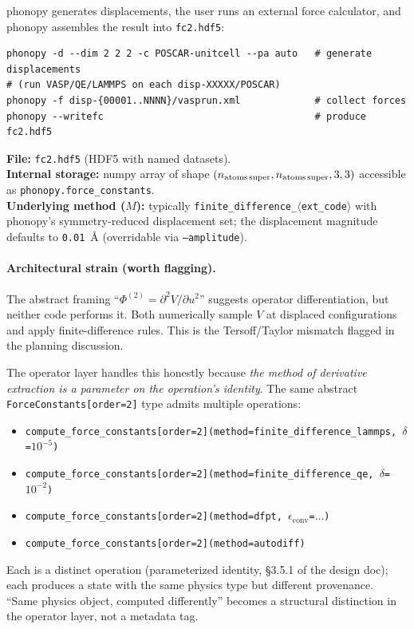 \documentclass[11pt,a4paper]{article}
\begin{document}
\begin{phonobox}
phonopy generates displacements, the user runs an external force calculator, and phonopy
assembles the result into \texttt{fc2.hdf5}:
\begin{verbatim}
phonopy -d --dim 2 2 2 -c POSCAR-unitcell --pa auto   # generate displacements
# (run VASP/QE/LAMMPS on each disp-XXXXX/POSCAR)
phonopy -f disp-{00001..NNNN}/vasprun.xml             # collect forces
phonopy --writefc                                     # produce fc2.hdf5
\end{verbatim}
\textbf{File:} \texttt{fc2.hdf5} (HDF5 with named datasets).\\
\textbf{Internal storage:} numpy array of shape
$(n_{\text{atoms\,super}}, n_{\text{atoms\,super}}, 3, 3)$ accessible as
\texttt{phonopy.force\_constants}.\\
\textbf{Underlying method ($M$):} typically \texttt{finite\_difference\_$\langle$ext\_code$\rangle$}
with phonopy's symmetry-reduced displacement set; the displacement magnitude defaults to
\texttt{0.01}~\AA{} (overridable via \texttt{--amplitude}).
\end{phonobox}

\paragraph{Architectural strain (worth flagging).} The abstract framing
``$\Phi^{(2)} = \partial^2 V / \partial u^2$'' suggests operator differentiation, but neither
code performs it. Both numerically sample $V$ at displaced configurations and apply
finite-difference rules. This is the Tersoff/Taylor mismatch flagged in the planning
discussion.

\medskip
The operator layer handles this honestly because \emph{the method of derivative extraction is a
parameter on the operation's identity}. The same abstract \texttt{ForceConstants[order=2]} type
admits multiple operations:
\begin{itemize}[leftmargin=2em, itemsep=0pt]
  \item \texttt{compute\_force\_constants[order=2](method=finite\_difference\_lammps,\,$\delta$=$10^{-5}$)}
  \item \texttt{compute\_force\_constants[order=2](method=finite\_difference\_qe,\,$\delta$=$10^{-2}$)}
  \item \texttt{compute\_force\_constants[order=2](method=dfpt,\,$\epsilon_{\text{conv}}$=$\dots$)}
  \item \texttt{compute\_force\_constants[order=2](method=autodiff)}
\end{itemize}
Each is a distinct operation (parameterized identity, \S3.5.1 of the design doc); each produces
a state with the same physics type but different provenance. ``Same physics object, computed
differently'' becomes a structural distinction in the operator layer, not a metadata tag.
\end{document}
